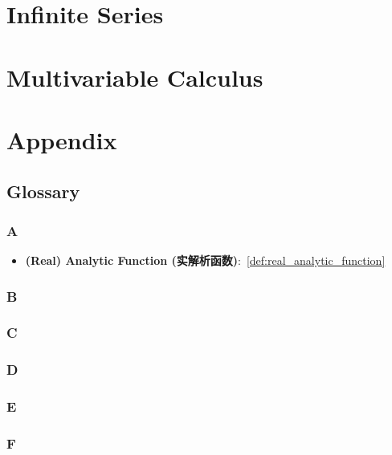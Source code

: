 \documentclass[11pt]{../../TexTemplate/elegantbook}
\begin{document}
\part{Infinite Series}
\part{Multivariable Calculus}

\appendix
\part{Appendix}
\chapter{Glossary}
\section*{A} %
\begin{itemize}
    \item \textbf{(Real) Analytic Function (实解析函数)}:~\ref{def:real_analytic_function}
\end{itemize}
\section*{B} %
\section*{C} %
\section*{D} %
\section*{E} %
\section*{F} %
\end{document}

